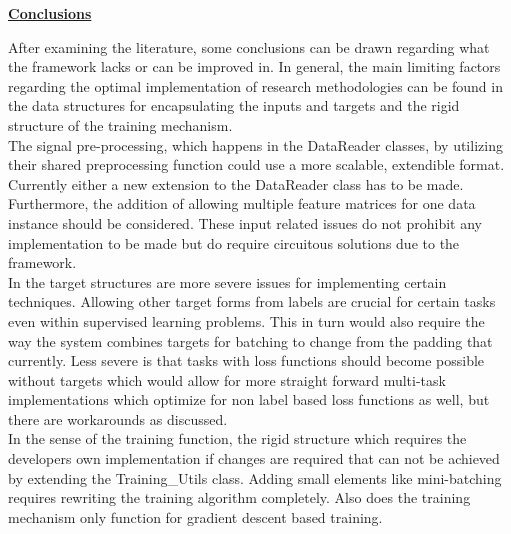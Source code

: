 \underline{\textbf{Conclusions}}

After examining the literature, some conclusions can be drawn regarding what the framework lacks or can be improved in. In general, the main limiting factors regarding the optimal implementation of research methodologies can be found in the data structures for encapsulating the inputs and targets and the rigid structure of the training mechanism. \\

The signal pre-processing, which happens in the DataReader classes, by utilizing their shared preprocessing function could use a more scalable, extendible format. Currently either a new extension to the DataReader class has to be made. Furthermore, the addition of allowing multiple feature matrices for one data instance should be considered. These input related issues do not prohibit any implementation to be made but do require circuitous solutions due to the framework.\\


In the target structures are more severe issues for implementing certain techniques. Allowing other target forms from labels are crucial for certain tasks even within supervised learning problems. This in turn would also require the way the system combines targets for batching to change from the padding that currently. Less severe is that tasks with loss functions should become possible without targets which would allow for more straight forward multi-task implementations which optimize for non label based loss functions as well, but there are workarounds as discussed.\\

In the sense of the training function, the rigid structure which requires the developers own implementation if changes are required that can not be achieved by extending the Training\_Utils class. Adding small elements like mini-batching requires rewriting the training algorithm completely. Also does the training mechanism only function for gradient descent based training. \\



